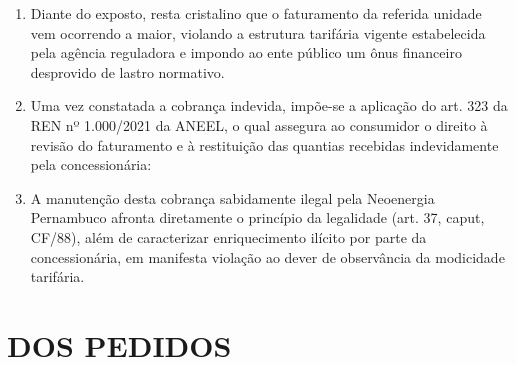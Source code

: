 \begin{enumerate}[resume]
\item Diante do exposto, resta cristalino que o faturamento da referida unidade vem ocorrendo a maior, violando a estrutura tarifária vigente estabelecida pela agência reguladora e impondo ao ente público um ônus financeiro desprovido de lastro normativo.

\item Uma vez constatada a cobrança indevida, impõe-se a aplicação do art. 323 da REN nº 1.000/2021 da ANEEL, o qual assegura ao consumidor o direito à revisão do faturamento e à restituição das quantias recebidas indevidamente pela concessionária:


\item A manutenção desta cobrança sabidamente ilegal pela Neoenergia Pernambuco afronta diretamente o princípio da legalidade (art. 37, caput, CF/88), além de caracterizar enriquecimento ilícito por parte da concessionária, em manifesta violação ao dever de observância da modicidade tarifária.

\end{enumerate}

\section{DOS PEDIDOS}

